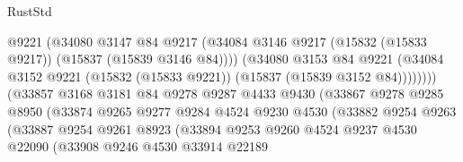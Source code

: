 \begin{lexlean}{RustStd}
\begin{coremodule}
{\begin{coremodule}
{{{{{{{{{{{{{{{{{{{{{{{{{{{{{{{{{{{{{{{{{{{{{{{{{{{{{{{{{{{{                                      @9221
                                      (@34080
                                        @3147
                                        @84
                                        @9217
                                        (@34084
                                          @3146
                                          @9217
                                          (@15832 (@15833 @9217))
                                          (@15837 (@15839 @3146 @84))))
                                      (@34080
                                        @3153
                                        @84
                                        @9221
                                        (@34084
                                          @3152
                                          @9221
                                          (@15832 (@15833 @9221))
                                          (@15837 (@15839 @3152 @84))))))))
                              (@33857
                                @3168
                                @3181
                                @84
                                @9278
                                @9287
                                @4433
                                @9430
                                (@33867
                                  @9278
                                  @9285
                                  @8950
                                  (@33874
                                    @9265
                                    @9277
                                    @9284
                                    @4524
                                    @9230
                                    @4530
                                    (@33882
                                      @9254
                                      @9263
                                      (@33887
                                        @9254
                                        @9261
                                        @8923
                                        (@33894
                                          @9253
                                          @9260
                                          @4524
                                          @9237
                                          @4530
                                          @22090
                                          (@33908
                                            @9246
                                            @4530
                                            @33914
                                            @22189
}}}}}}}}}}}}}}}}}}}}}}}}}}}}}}}}}}}}}}}}}}}}}}}}}}}}}}}}}}}}
\end{coremodule}}
\end{coremodule}
\end{lexlean}
